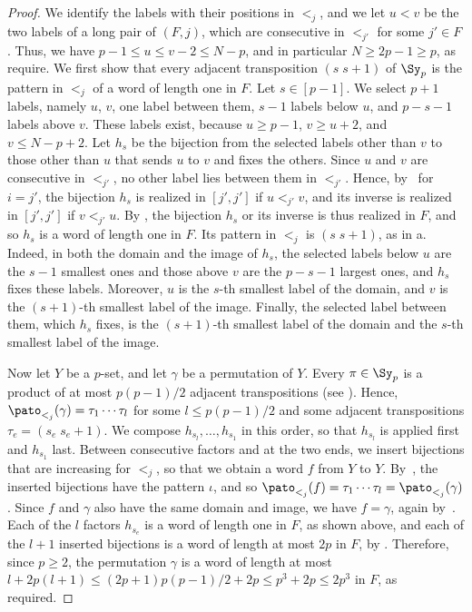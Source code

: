 \documentclass[fontsize=12pt,leading=14pt]{fullpaper}
\begin{document}
\begin{proof}
  We identify the labels with their positions in $<_j$, and we let $u<v$ be the two labels of a long pair of $(F,j)$, which are consecutive in $<_{j'}$ for some $j'\in F$.
  Thus, we have $p-1\le u\le v-2\le N-p$, and in particular $N\ge2p-1\ge p$, as  require.
  We first show that every adjacent transposition $(s\;s{+}1)$ of $\Sy_p$ is the pattern in $<_j$ of a word of length one in $F$.
  Let $s\in[p-1]$.
  We select $p+1$ labels, namely $u$, $v$, one label between them, $s-1$ labels below $u$, and $p-s-1$ labels above $v$.
  These labels exist, because $u\ge p-1$, $v\ge u+2$, and $v\le N-p+2$.
  Let $h_s$ be the bijection from the selected labels other than $v$ to those other than $u$ that sends $u$ to $v$ and fixes the others.
  Since $u$ and $v$ are consecutive in $<_{j'}$, no other label lies between them in $<_{j'}$.
  Hence, by~ for $i=j'$, the bijection $h_s$ is realized in $[j',j']$ if $u<_{j'}v$, and its inverse is realized in $[j',j']$ if $v<_{j'}u$.
  By , the bijection $h_s$ or its inverse is thus realized in $F$, and so $h_s$ is a word of length one in $F$.
  Its pattern in $<_j$ is $(s\;s{+}1)$, as in a.
  Indeed, in both the domain and the image of $h_s$, the selected labels below $u$ are the $s-1$ smallest ones and those above $v$ are the $p-s-1$ largest ones, and $h_s$ fixes these labels.
  Moreover, $u$ is the $s$-th smallest label of the domain, and $v$ is the $(s+1)$-th smallest label of the image.
  Finally, the selected label between them, which $h_s$ fixes, is the $(s+1)$-th smallest label of the domain and the $s$-th smallest label of the image.

  Now let $Y$ be a $p$-set, and let $\gamma$ be a permutation of $Y$.
  Every $\pi\in\Sy_p$ is a product of at most $p(p-1)/2$ adjacent transpositions (see ).
  Hence, $\pato_{<_j}(\gamma)=\tau_1\cdots\tau_l$ for some $l\le p(p-1)/2$ and some adjacent transpositions $\tau_e=(s_e\;s_e{+}1)$.
  We compose $h_{s_l},\dots,h_{s_1}$ in this order, so that $h_{s_l}$ is applied first and $h_{s_1}$ last.
  Between consecutive factors and at the two ends, we insert bijections that are increasing for $<_j$, so that we obtain a word $f$ from $Y$ to $Y$.
  By~, the inserted bijections have the pattern $\iota$, and so $\pato_{<_j}(f)=\tau_1\cdots\tau_l=\pato_{<_j}(\gamma)$.
  Since $f$ and $\gamma$ also have the same domain and image, we have $f=\gamma$, again by~.
  Each of the $l$ factors $h_{s_e}$ is a word of length one in $F$, as shown above, and each of the $l+1$ inserted bijections is a word of length at most $2p$ in $F$, by .
  Therefore, since $p\ge2$, the permutation $\gamma$ is a word of length at most $l+2p(l+1)\le(2p+1)p(p-1)/2+2p\le p^3+2p\le2p^3$ in $F$, as required.
\end{proof}
\end{document}
